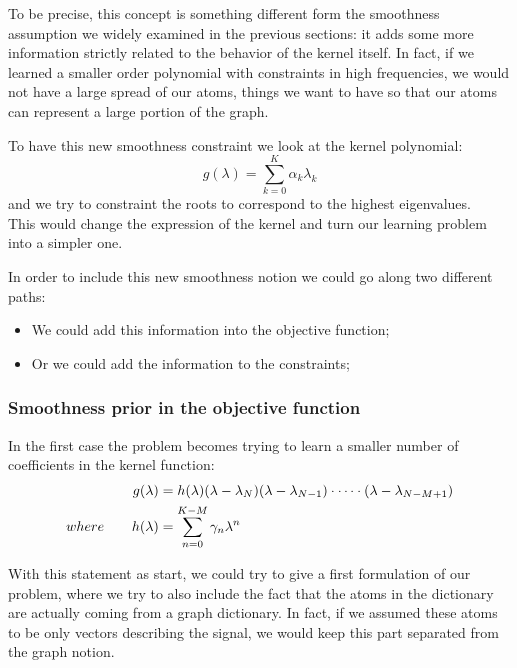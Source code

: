 To  be precise, this concept is something different form the smoothness assumption we widely examined in the previous sections: it adds some more information strictly related to the behavior of the kernel itself. In fact, if we learned a smaller order polynomial with constraints in high frequencies, we would not have a large spread of our atoms, things we want to have so that our atoms can represent a large portion of the graph.

To have this new smoothness constraint we look at the kernel polynomial:
\begin{equation}
g(\lambda) = \sum_{k=0}^{K}\alpha_k \lambda_k
\end{equation}
and we try to constraint the roots to correspond to the highest eigenvalues.\\
This would change the expression of the kernel and turn our learning problem into a simpler one.

In order to include this new smoothness notion we could go along two different paths:
\begin{itemize}
\item We could add this information into the objective function;
\item Or we could add the information to the constraints;
\end{itemize}

\subsubsection{Smoothness prior in the objective function}
In the first case the problem becomes trying to learn a smaller number of coefficients in the kernel function:
\begin{align}
g(\lambda) &= h(\lambda)(\lambda - \lambda_N)(\lambda - \lambda_{N-1})\cdot \dots \cdot (\lambda - \lambda_{N-M+1}) \label{eq:polynom}\\
where \qquad h(\lambda) &= \sum_{n=0}^{K-M}\gamma_n\lambda^{n} \notag
\end{align}

With this statement as start, we could try to give a first formulation of our problem, where we try to also include the fact that the atoms in the dictionary are actually coming from a graph dictionary. In fact, if we assumed these atoms to be only vectors describing the signal, we would keep this part separated from the graph notion.

